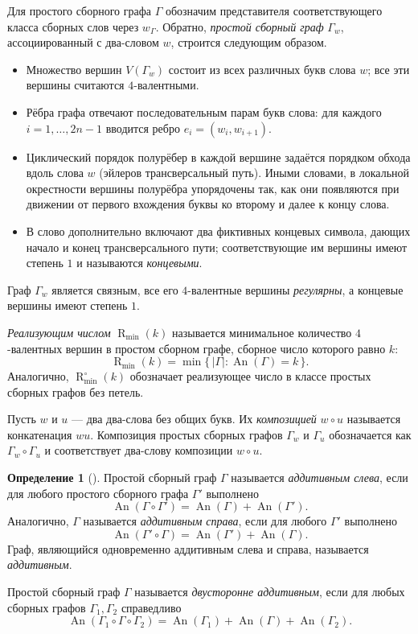 \documentclass{article}
\theoremstyle{definition}
\newtheorem{definition}[theorem]{Определение}
\newcommand{\An}{\operatorname{An}}
\newcommand{\Rmin}{\operatorname{R}_{\min}}
\newcommand{\Romin}{\operatorname{R}_{\min}^\circ}
\begin{document}
Для простого сборного графа \(\Gamma\) обозначим представителя соответствующего класса сборных слов через \(w_\Gamma\). Обратно, \emph{простой сборный граф} $\Gamma_w$, ассоциированный с два-словом $w$, строится следующим образом.
\begin{itemize}
    \item Множество вершин $V(\Gamma_w)$ состоит из всех различных букв слова $w$; все эти вершины считаются $4$-валентными.
    \item Рёбра графа отвечают последовательным парам букв слова: для каждого $i=1,\dots,2n-1$ вводится ребро $e_i=(w_i,w_{i+1})$.
    \item Циклический порядок полурёбер в каждой вершине задаётся порядком обхода вдоль слова $w$ (эйлеров трансверсальный путь). Иными словами, в локальной окрестности вершины полурёбра упорядочены так, как они появляются при движении от первого вхождения буквы ко второму и далее к концу слова.
    \item В слово дополнительно включают два фиктивных концевых символа, дающих начало и конец трансверсального пути; соответствующие им вершины имеют степень $1$ и называются \emph{концевыми}.
\end{itemize}
Граф $\Gamma_w$ является связным, все его $4$-валентные вершины \emph{регулярны}, а концевые вершины имеют степень $1$.

\emph{Реализующим числом} $\Rmin(k)$ называется минимальное количество $4$-валентных вершин в простом сборном графе, сборное число которого равно $k$:
\[
\Rmin(k)=\min\{\,|\Gamma|:\An(\Gamma)=k\,\}.
\]
Аналогично, $\Romin(k)$ обозначает реализующее число в классе простых сборных графов без петель.

Пусть $w$ и $u$ — два два-слова без общих букв. Их \emph{композицией} $w\circ u$ называется конкатенация $wu$. Композиция простых сборных графов $\Gamma_w$ и $\Gamma_u$ обозначается как $\Gamma_w \circ \Gamma_u$ и соответствует два-слову композиции $w\circ u$.

\begin{definition}[{\cite[Definition 2.3.1]{Muche2012}}]
    Простой сборный граф $\Gamma$ называется \emph{аддитивным слева}, если для любого простого сборного графа $\Gamma'$ выполнено
    \[
        \An(\Gamma \circ \Gamma') = \An(\Gamma) + \An(\Gamma').
    \]
    Аналогично, $\Gamma$ называется \emph{аддитивным справа}, если для любого $\Gamma'$ выполнено
    \[
        \An(\Gamma' \circ \Gamma) = \An(\Gamma') + \An(\Gamma).
    \]
    Граф, являющийся одновременно аддитивным слева и справа, называется \emph{аддитивным}.

    Простой сборный граф $\Gamma$ называется \emph{двусторонне аддитивным}, если для любых сборных графов $\Gamma_1,\Gamma_2$ справедливо
    \[
        \An(\Gamma_1 \circ \Gamma \circ \Gamma_2) =
        \An(\Gamma_1) + \An(\Gamma) + \An(\Gamma_2).
    \]
\end{definition}
\end{document}
